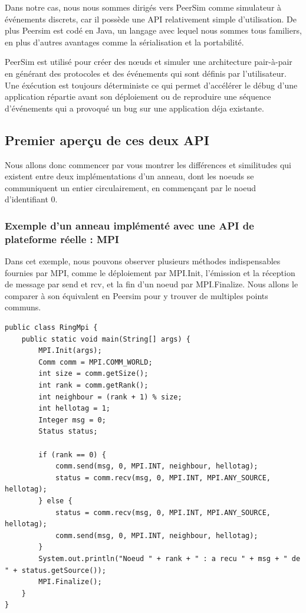 \documentclass{article}
\begin{document}
					Dans notre cas, nous nous sommes dirigés vers PeerSim comme simulateur à événements discrets, car il possède une API relativement simple d'utilisation. De plus Peersim est codé en Java, un langage avec lequel nous sommes tous familiers, en plus d'autres avantages comme la sérialisation et la portabilité.

					PeerSim est utilisé pour créer des nœuds et simuler une architecture pair-à-pair en générant des protocoles et des événements qui sont définis par l'utilisateur. Une éxécution est toujours déterministe ce qui permet d'accélérer le débug d'une application répartie avant son déploiement ou de reproduire une séquence d'événements qui a provoqué un bug sur une application déja existante.

			
			\newpage
			\subsection{Premier aperçu de ces deux API}
			Nous allons donc commencer par vous montrer les différences et similitudes qui existent entre deux implémentations d'un anneau, dont les noeuds se communiquent un entier circulairement, en commençant par le noeud d'identifiant 0. 

			\subsubsection{Exemple d'un anneau implémenté avec une API de plateforme réelle : MPI}
			Dans cet exemple, nous pouvons observer plusieurs méthodes indispensables fournies par MPI, comme le déploiement par MPI.Init, l'émission et la réception de message par send et rcv, et la fin d'un noeud par MPI.Finalize. Nous allons le comparer à son équivalent en Peersim pour y trouver de multiples points communs.
			\begin{lstlisting}
public class RingMpi {
	public static void main(String[] args) {
		MPI.Init(args);
		Comm comm = MPI.COMM_WORLD;
		int size = comm.getSize();
		int rank = comm.getRank();
		int neighbour = (rank + 1) % size;
		int hellotag = 1;
		Integer msg = 0;
		Status status;

		if (rank == 0) {
			comm.send(msg, 0, MPI.INT, neighbour, hellotag);
			status = comm.recv(msg, 0, MPI.INT, MPI.ANY_SOURCE, hellotag);
		} else {
			status = comm.recv(msg, 0, MPI.INT, MPI.ANY_SOURCE, hellotag);
			comm.send(msg, 0, MPI.INT, neighbour, hellotag);
		}
		System.out.println("Noeud " + rank + " : a recu " + msg + " de " + status.getSource());
		MPI.Finalize();
	}
}
			\end{lstlisting}
			\newpage
\end{document}
